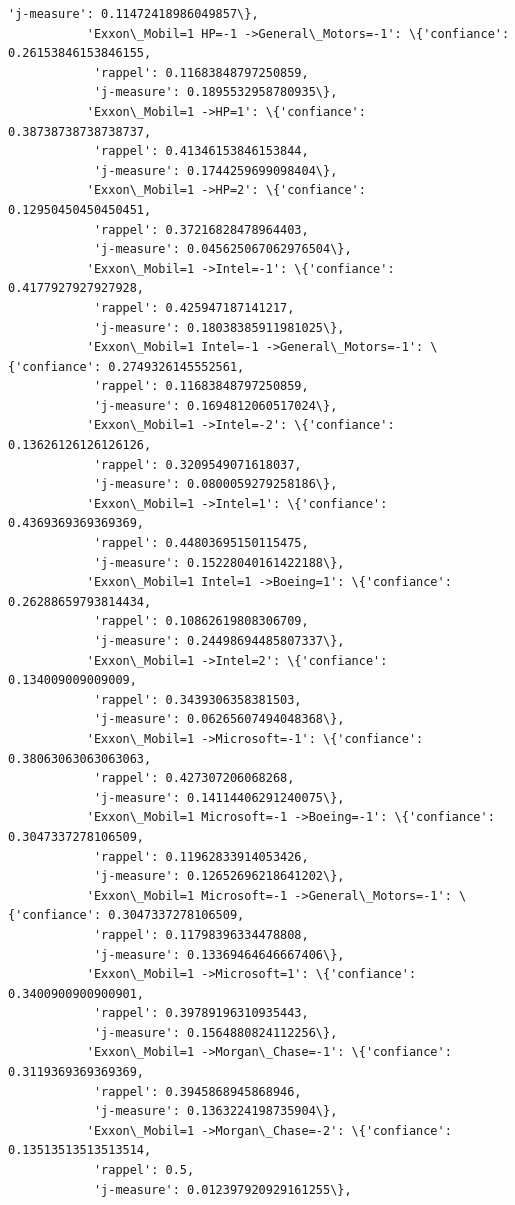 \documentclass[11pt]{article}
\begin{document}
\begin{Verbatim}[commandchars=\\\{\}]
            'j-measure': 0.11472418986049857\},
           'Exxon\_Mobil=1 HP=-1 ->General\_Motors=-1': \{'confiance': 0.26153846153846155,
            'rappel': 0.11683848797250859,
            'j-measure': 0.1895532958780935\},
           'Exxon\_Mobil=1 ->HP=1': \{'confiance': 0.38738738738738737,
            'rappel': 0.41346153846153844,
            'j-measure': 0.1744259699098404\},
           'Exxon\_Mobil=1 ->HP=2': \{'confiance': 0.12950450450450451,
            'rappel': 0.37216828478964403,
            'j-measure': 0.045625067062976504\},
           'Exxon\_Mobil=1 ->Intel=-1': \{'confiance': 0.4177927927927928,
            'rappel': 0.425947187141217,
            'j-measure': 0.18038385911981025\},
           'Exxon\_Mobil=1 Intel=-1 ->General\_Motors=-1': \{'confiance': 0.2749326145552561,
            'rappel': 0.11683848797250859,
            'j-measure': 0.1694812060517024\},
           'Exxon\_Mobil=1 ->Intel=-2': \{'confiance': 0.13626126126126126,
            'rappel': 0.3209549071618037,
            'j-measure': 0.0800059279258186\},
           'Exxon\_Mobil=1 ->Intel=1': \{'confiance': 0.4369369369369369,
            'rappel': 0.44803695150115475,
            'j-measure': 0.15228040161422188\},
           'Exxon\_Mobil=1 Intel=1 ->Boeing=1': \{'confiance': 0.26288659793814434,
            'rappel': 0.10862619808306709,
            'j-measure': 0.24498694485807337\},
           'Exxon\_Mobil=1 ->Intel=2': \{'confiance': 0.134009009009009,
            'rappel': 0.3439306358381503,
            'j-measure': 0.06265607494048368\},
           'Exxon\_Mobil=1 ->Microsoft=-1': \{'confiance': 0.38063063063063063,
            'rappel': 0.427307206068268,
            'j-measure': 0.14114406291240075\},
           'Exxon\_Mobil=1 Microsoft=-1 ->Boeing=-1': \{'confiance': 0.3047337278106509,
            'rappel': 0.11962833914053426,
            'j-measure': 0.12652696218641202\},
           'Exxon\_Mobil=1 Microsoft=-1 ->General\_Motors=-1': \{'confiance': 0.3047337278106509,
            'rappel': 0.11798396334478808,
            'j-measure': 0.13369464646667406\},
           'Exxon\_Mobil=1 ->Microsoft=1': \{'confiance': 0.3400900900900901,
            'rappel': 0.39789196310935443,
            'j-measure': 0.1564880824112256\},
           'Exxon\_Mobil=1 ->Morgan\_Chase=-1': \{'confiance': 0.3119369369369369,
            'rappel': 0.3945868945868946,
            'j-measure': 0.1363224198735904\},
           'Exxon\_Mobil=1 ->Morgan\_Chase=-2': \{'confiance': 0.13513513513513514,
            'rappel': 0.5,
            'j-measure': 0.012397920929161255\},

\end{Verbatim}
\end{document}
